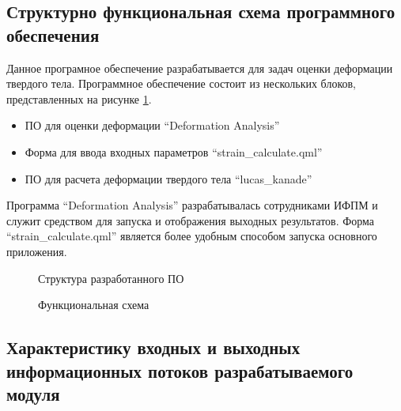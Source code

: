 \subsection{Структурно функциональная схема программного обеспечения}%

Данное програмное обеспечение разрабатывается для задач оценки деформации твердого тела. Программное обеспечение состоит из нескольких блоков, представленных на рисунке \ref{pic:shema_PO}.

\begin{itemize}
\item ПО для оценки деформации ``Deformation Analysis''
\item Форма для ввода входных параметров ``strain\_calculate.qml''
\item ПО для расчета деформации твердого тела ``lucas\_kanade''
\end{itemize}

Программа ``Deformation Analysis'' разрабатывалась сотрудниками ИФПМ и служит средством для запуска и отображения выходных результатов. Форма ``strain\_calculate.qml'' является более удобным способом запуска основного приложения. 

\begin{figure}[ht]
\caption{Структура разработанного ПО}
\label{pic:shema_PO}
\end{figure}

\begin{figure}[ht]
\caption{Функциональная схема}
\label{pic:idef0}
\end{figure}

\subsection{Характеристику входных и выходных информационных потоков разрабатываемого модуля}

